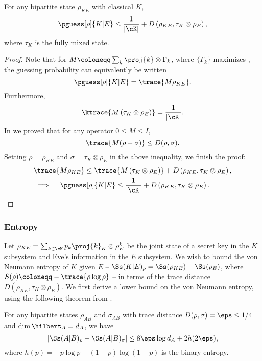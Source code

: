 \begin{lem}
  \label{lem:pguess}
For any bipartite state $\rho_{KE}$ with classical $K$, 
\[\pguess[\rho]{K|E} \leq
\frac{1}{|\cK|} + D\left( \rho_{KE},\tau_K \otimes \rho_E\right),
\] where $\tau_K$ is the fully mixed state.
\end{lem}

\begin{proof}
  Note that for $M \coloneqq \sum_k \proj{k} \otimes \Gamma_k$, where
  $\{\Gamma_k\}$ maximizes , the guessing
  probability can equivalently be written \[\pguess[\rho]{K|E} =
  \trace{M \rho_{KE}}. \] Furthermore,
\[\ktrace{M \left(\tau_K \otimes \rho_{E}\right)} = \frac{1}{|\cK|}. \]
In  we proved that for any
operator $0 \leq M \leq I$,
\[\trace{M(\rho - \sigma)} \leq D(\rho,\sigma). \]
Setting $\rho = \rho_{KE}$ and $\sigma = \tau_K \otimes \rho_{E}$ in
the above inequality, we finish the proof:
\begin{align*}
& \trace{M\rho_{KE}} \leq \trace{M\left(\tau_K \otimes \rho_{E}\right)}
+ D\left( \rho_{KE} , \tau_K \otimes \rho_{E} \right) , \\
 & \implies \quad \pguess[\rho]{K|E} \leq \frac{1}{|\cK|} + D\left( \rho_{KE},\tau_K
   \otimes \rho_E\right) . \qedhere
\end{align*}
\end{proof}


\subsubsection{Entropy}
\label{app:op.local.entropy}

Let $\rho_{KE} = \sum_{k \in \cK} p_k \proj{k}_K \otimes \rho^k_E$ be
the joint state of a secret key in the $K$ subsystem and Eve's
information in the $E$ subsystem. We wish to bound the von Neumann
entropy of $K$ given $E$ \--- $\Ss(K|E)_{\rho} = \Ss(\rho_{KE}) -
\Ss(\rho_E)$, where $S(\rho) \coloneqq -\trace{\rho \log \rho}$ \---
in terms of the trace distance $D\left( \rho_{KE},\tau_K \otimes
  \rho_E\right)$. We first derive a lower bound on the von Neumann
entropy, using the following theorem from \textcite{AF04}.

\begin{thm}
  \label{thm:AF04}
  For any bipartite states $\rho_{AB}$ and $\sigma_{AB}$ with trace
  distance $D(\rho,\sigma) = \eps \leq 1/4$ and $\dim \hilbert_A =
  d_A$, we have \[ \left| \Ss(A|B)_\rho - \Ss(A|B)_\sigma \right| \leq
  8 \eps \log d_A + 2h(2\eps) , \] where $h(p) = - p \log p - (1-p)
  \log (1-p)$ is the binary entropy.
\end{thm}


